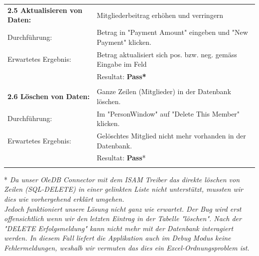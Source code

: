 \documentclass{article}
\begin{document}
\begin{tabular}{l|p{12cm}}
	\textbf{2.5 Aktualisieren von Daten:} & Mitgliederbeitrag erhöhen und verringern\\
		Durchführung:			& Betrag in "Payment Amount" eingeben und "New Payment" klicken.\\
		Erwartetes Ergebnis: 	& Betrag aktualisiert sich pos. bzw. neg. gemäss Eingabe im Feld \\
								& Resultat:  \textbf{Pass*}\hspace{7.6cm} \color{green} {\ding{51}} \\
								\\	
	\textbf{2.6 Löschen von Daten:} & Ganze Zeilen (Mitglieder) in der Datenbank löschen.\\
		Durchführung:			& Im "PersonWindow" auf "Delete This Member" klicken.\\
		Erwartetes Ergebnis: 	& Gelöschtes Mitglied nicht mehr vorhanden in der Datenbank. \\
								& Resultat:  \textbf{Pass}*\hspace{7.6cm} \color{carrotorange} {\ding{51}} \\
								\\								
	
\end{tabular}

* \textit{Da unser OleDB Connector mit dem ISAM Treiber das direkte löschen von Zeilen (SQL-DELETE) in einer gelinkten Liste nicht unterstützt, mussten wir dies wie vorhergehend erklärt umgehen. 
\\
Jedoch funktioniert unsere Lösung nicht ganz wie erwartet. Der Bug wird erst offensichtlich wenn wir den letzten Eintrag in der Tabelle "löschen". Nach der "DELETE Erfolgsmeldung" kann nicht mehr mit der Datenbank interagiert werden. In diesem Fall liefert die Applikation auch im Debug Modus keine Fehlermeldungen, weshalb wir vermuten das dies ein Excel-Ordnungsproblem ist.} \\
\end{document}
